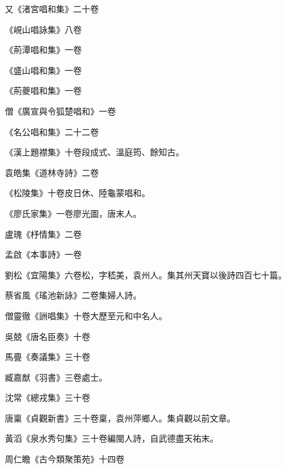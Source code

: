 \begin{pinyinscope}
 又《渚宮唱和集》二十卷



 《峴山唱詠集》八卷



 《荊潭唱和集》一卷



 《盛山唱和集》一卷



 《荊夔唱和集》一卷



 僧《廣宣與令狐楚唱和》一卷



 《名公唱和集》二十二卷



 《漢上題襟集》十卷段成式、溫庭筠、餘知古。



 袁皓集《道林寺詩》二卷



 《松陵集》十卷皮日休、陸龜蒙唱和。



 《廖氏家集》一卷廖光圖，唐末人。



 盧瑰《杼情集》二卷



 孟啟《本事詩》一卷



 劉松《宜陽集》六卷松，字嵇美，袁州人。集其州天寶以後詩四百七十篇。



 蔡省風《瑤池新詠》二卷集婦人詩。



 僧靈徹《詶唱集》十卷大歷至元和中名人。



 吳兢《唐名臣奏》十卷



 馬亹《奏議集》三十卷



 臧嘉猷《羽書》三卷處士。



 沈常《總戎集》三十卷



 唐稟《貞觀新書》三十卷稟，袁州萍鄉人。集貞觀以前文章。



 黃滔《泉水秀句集》三十卷編閩人詩，自武德盡天祐末。



 周仁瞻《古今類聚策苑》十四卷




\end{pinyinscope}
